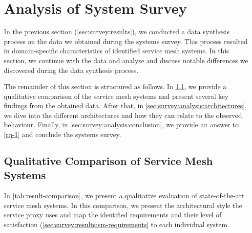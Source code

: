 \section{Analysis of System Survey}
\label{sec:survey:analysis}


In the previous section (\cref{sec:survey:results}), we conducted a data synthesis process on the data we obtained during the systems survey. This process resulted in domain-specific characteristics of identified service mesh systems. In this section, we continue with the data and analyse and discuss notable differences we discovered during the data synthesis process.

The remainder of this section is structured as follows. In \cref{sec:survey:analysis:sm-framework}, we provide a qualitative comparison of the service mesh systems and present several key findings from the obtained data. After that, in \cref{sec:survey:analysis:architectures}, we dive into the different architectures and how they can relate to the observed behaviour. Finally, in \cref{sec:survey:analysis:conclusion}, we provide an answer to \ref{rq-1} and conclude the systems survey.


\subsection{Qualitative Comparison of Service Mesh Systems}
\label{sec:survey:analysis:sm-framework}

In \cref{tab:result-comparison}, we present a qualitative evaluation of state-of-the-art service mesh systems. In this comparison, we present the architectural style the service proxy uses and map the identified requirements and their level of satisfaction (\cref{sec:survey:results:sm-requirements} to each individual system. 



